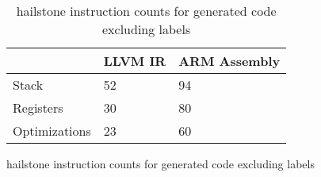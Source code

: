 \begin{table}[h!]
\centering
\begin{tabular}{p{}p{}p{}}
  \hline
 & LLVM IR & ARM Assembly \\ 
  \hline
Stack &  52 &  94 \\ 
  Registers &  30 &  80 \\ 
  Optimizations &  23 &  60 \\ 
   \hline
\end{tabular}
\caption{hailstone instruction counts for generated code excluding labels}
\caption{hailstone instruction counts for generated code excluding labels}
\end{table}
